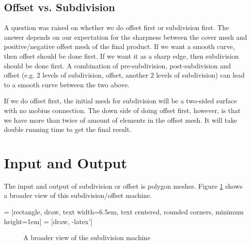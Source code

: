 \documentclass[12pt]{article}
\begin{document}
\subsection{Offset vs. Subdivision}
A question was raised on whether we do offset first or subdivision first. The answer depends on our expectation for the sharpness between the cover mesh and positive/negative offest mesh of the final product. If we want a smooth curve, then offset should be done first. If we want it as a sharp edge, then subdivision should be done first. A combination of pre-subdivision, post-subdivision and offset (e.g. 2 levels of subdivision, offset, another 2 levels of subdivision) can lead to a smooth curve between the two above.

If we do offset first, the initial mesh for subdivision will be a two-sided surface with no mobius connection. The down side of doing offset first, however, is that we have more than twice of amount of elements in the offset mesh. It will take double running time to get the final result.

\section{Input and Output}
The input and output of subdivision or offset is polygon meshes. Figure \ref{figure:birdView} shows a broader view of this subdivision/offset machine.

 = [rectangle, draw, 
    text width=6.5em, text centered, rounded corners, minimum height=1em]
 = [draw, -latex']

\begin{figure}[ht]
  \centering    
    \caption{A broader view of the subdivision machine}
    \label{figure:birdView}
\end{figure}
\end{document}
